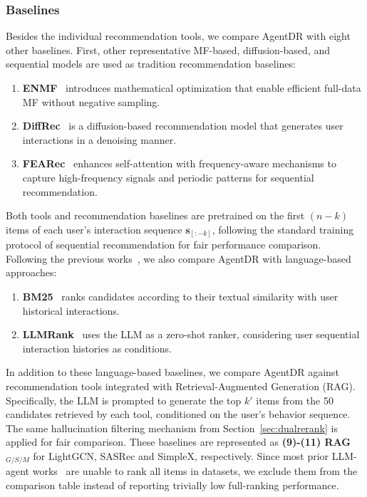 \subsubsection{Baselines}
Besides the individual recommendation tools, we compare AgentDR with eight other baselines.
First, other representative MF-based, diffusion-based, and sequential models are used as tradition recommendation baselines:
\begin{enumerate}[left=0pt, label=\textbf{(\arabic*)}, start=4]
    \item \textbf{ENMF}~\cite{enmf} introduces mathematical optimization that enable efficient full-data MF without negative sampling.
    \item \textbf{DiffRec}~\cite{diffrec} is a diffusion-based recommendation model that generates user interactions in a denoising manner.
    \item \textbf{FEARec}~\cite{fearec} enhances self-attention with frequency-aware mechanisms to capture high-frequency signals and periodic patterns for sequential recommendation.
\end{enumerate}
Both tools and recommendation baselines are pretrained on the first $(n-k)$ items of each user’s interaction sequence $\mathbf{s}_{[:-k]}$, following the standard training protocol of sequential recommendation for fair performance comparison.
Following the previous works~\cite{agentcf, iagent}, we also compare AgentDR with language-based approaches:
\begin{enumerate}[left=0pt, label=\textbf{(\arabic*)}, start=7]
    \item \textbf{BM25}~\cite{bm25} ranks candidates according to their textual similarity with user historical interactions.
    \item \textbf{LLMRank}~\cite{llmrank} uses the LLM as a zero-shot ranker, considering user sequential interaction histories as conditions.
\end{enumerate}
In addition to these language-based baselines, 
we compare AgentDR against recommendation tools integrated with Retrieval-Augmented Generation (RAG). 
Specifically, the LLM is prompted to generate the top $k'$ items from the 50 candidates retrieved by each tool,
conditioned on the user’s behavior sequence. 
The same hallucination filtering mechanism from Section~\ref{sec:dualrerank} is applied for fair comparison. 
These baselines are represented as \textbf{(9)-(11) \boldmath RAG$_{\mathit{G/S/M}}$} for LightGCN, SASRec and SimpleX, respectively. 
Since most prior LLM-agent works~\cite{agentcf, recmind, interecagent, agent4rec, recagent, iagent} are unable to rank all items in datasets, we exclude them from the comparison table instead of reporting trivially low full-ranking performance.
